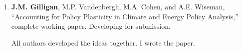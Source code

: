 %
%
\begin{enumerate}
    \item
    \textbf{J.M. Gilligan}, M.P. Vandenbergh, M.A. Cohen, and A.E. Wiseman,
    ``Accounting for Policy Plasticity in Climate and Energy Policy Analysis,''
    complete working paper.
    Developing for submission.
\begin{credit}
All authors developed the ideas together. I wrote the paper.
\end{credit}
%
\end{enumerate}
